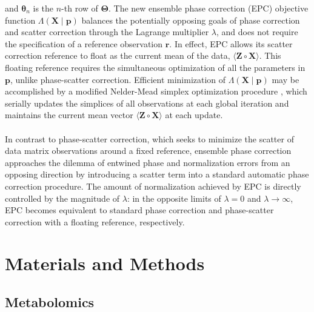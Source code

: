 \begin{doublespace}
and $\boldsymbol{\theta}_n$ is the $n$-th row of $\mathbf{\Theta}$. The new
ensemble phase correction (EPC) objective function
$\Lambda(\mathbf{X} \mid \mathbf{p})$ balances the potentially opposing goals
of phase correction and scatter correction through the Lagrange multiplier
$\lambda$, and does not require the specification of a reference observation
$\mathbf{r}$. In effect, EPC allows its scatter correction reference to float
as the current mean of the data, $\langle \mathbf{Z} \circ \mathbf{X} \rangle$.
This floating reference requires the simultaneous optimization of all the
parameters in $\mathbf{p}$, unlike phase-scatter correction. Efficient
minimization of $\Lambda(\mathbf{X} \mid \mathbf{p})$ may be accomplished by
a modified Nelder-Mead simplex optimization procedure \cite{nelder:compj1964},
which serially updates the simplices of all observations at each global
iteration and maintains the current mean vector
$\langle \mathbf{Z} \circ \mathbf{X} \rangle$ at each update.
\\\\
In contrast to phase-scatter correction, which seeks to minimize the scatter
of data matrix observations around a fixed reference, ensemble phase correction
approaches the dilemma of entwined phase and normalization errors from an
opposing direction by introducing a scatter term into a standard automatic
phase correction procedure. The amount of normalization achieved by EPC is
directly controlled by the magnitude of $\lambda$: in the opposite limits of
$\lambda = 0$ and $\lambda \to \infty$, EPC becomes equivalent to standard
phase correction and phase-scatter correction with a floating reference,
respectively.
\end{doublespace}

\section{Materials and Methods}

\subsection{Metabolomics}

